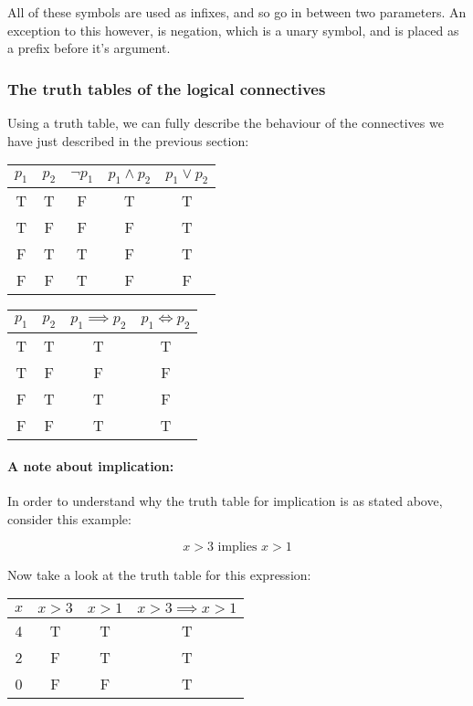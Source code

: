 All of these symbols are used as infixes, and so go in between two parameters.
An exception to this however, is negation, which is a unary symbol, and is
placed as a prefix before it's argument.


\subsubsection{The truth tables of the logical connectives}

Using a truth table, we can fully describe the behaviour of the connectives we
have just described in the previous section:

\begin{center}
	\begin{tabular}{|c|c|c|c|c|}
		\hline
		$p_1$& $p_2$& $\neg p_1$& $p_1 \wedge p_2$& $p_1 \vee p_2$\\ \hline
		T& T& F& T &T\\
		T& F& F& F &T\\
		F& T& T& F &T\\
		F& F& T& F &F\\ \hline
	\end{tabular}
	\begin{tabular}{|c|c|c|c|}
		\hline
		$p_1$& $p_2$& $p_1 \implies p_2$& $p_1 \iff p_2$\\ \hline
		T& T& T &T\\
		T& F& F &F\\
		F& T& T &F\\
		F& F& T &T\\ \hline
	\end{tabular}
\end{center}

\paragraph{A note about implication:}
In order to understand why the truth table for implication is as stated above,
consider this example:

\begin{dmath}
	x > 3 \textrm{ implies } x > 1
\end{dmath}

Now take a look at the truth table for this expression:

\begin{center}
	\begin{tabular}{|c|c|c|c|}
		\hline
		$x$ & $x > 3$ & $x > 1$ & $x > 3 \implies x > 1$\\ \hline
		4 & T & T & T\\
		2 & F & T & T\\
		0 & F & F & T\\ \hline
	\end{tabular}
\end{center}

